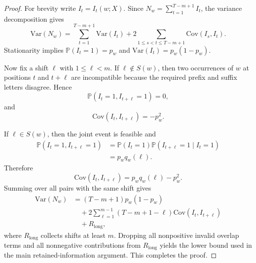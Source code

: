 \documentclass[11pt,a4paper]{article}
\begin{document}
\begin{proof}
For brevity write $I_t=I_t(w;X)$. Since $N_w=\sum_{t=1}^{T-m+1} I_t$, the variance decomposition gives
\begin{equation}
\mathrm{Var}(N_w)
=
\sum_{t=1}^{T-m+1}\mathrm{Var}(I_t)
+
2\sum_{1\leq s<t\leq T-m+1}\mathrm{Cov}(I_s,I_t).
\label{eq:appvardecomp}
\end{equation}
Stationarity implies $\mathbb{P}(I_t=1)=p_w$ and $\mathrm{Var}(I_t)=p_w(1-p_w)$.

Now fix a shift $\ell$ with $1\leq \ell < m$. If $\ell \notin S(w)$, then two occurrences of $w$ at positions $t$ and $t+\ell$ are incompatible because the required prefix and suffix letters disagree. Hence
\begin{equation}
\mathbb{P}(I_t=1,I_{t+\ell}=1)=0,
\label{eq:appinvalid}
\end{equation}
and
\begin{equation}
\mathrm{Cov}(I_t,I_{t+\ell}) = -p_w^2.
\label{eq:appinvalidcov}
\end{equation}

If $\ell \in S(w)$, then the joint event is feasible and
\begin{equation}
\begin{aligned}
\mathbb{P}(I_t=1,I_{t+\ell}=1)
&= \mathbb{P}(I_t=1)\mathbb{P}(I_{t+\ell}=1\mid I_t=1) \\
&= p_w q_w(\ell).
\end{aligned}
\label{eq:appvalid}
\end{equation}
Therefore
\begin{equation}
\mathrm{Cov}(I_t,I_{t+\ell})
=
p_w q_w(\ell)-p_w^2.
\label{eq:appvalidcov}
\end{equation}
Summing over all pairs with the same shift gives
\begin{equation}
\begin{aligned}
\mathrm{Var}(N_w)
&= (T-m+1)p_w(1-p_w) \\
&\quad + 2\sum_{\ell=1}^{m-1}(T-m+1-\ell)\mathrm{Cov}(I_t,I_{t+\ell}) \\
&\quad + R_{\mathrm{long}},
\end{aligned}
\label{eq:applocalsum}
\end{equation}
where $R_{\mathrm{long}}$ collects shifts at least $m$. Dropping all nonpositive invalid overlap terms and all nonnegative contributions from $R_{\mathrm{long}}$ yields the lower bound used in the main retained-information argument. This completes the proof.
\end{proof}
\end{document}
